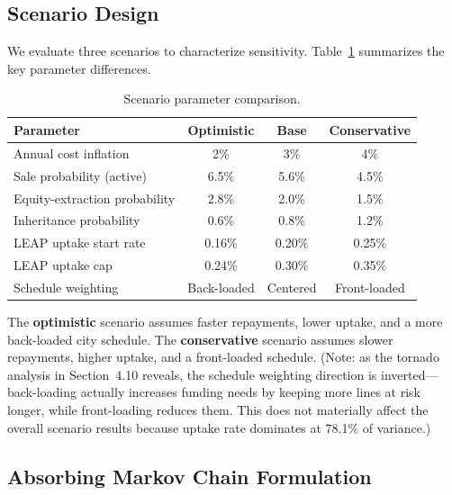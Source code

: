 \documentclass[11pt, letterpaper]{article}
\begin{document}
\subsection{Scenario Design}

We evaluate three scenarios to characterize sensitivity. Table~\ref{tab:scenarios} summarizes the key parameter differences.

\begin{table}[H]
  \centering
  \caption{Scenario parameter comparison.}
  \label{tab:scenarios}
  \begin{tabular}{@{}lccc@{}}
    \toprule
    \textbf{Parameter} & \textbf{Optimistic} & \textbf{Base} & \textbf{Conservative} \\
    \midrule
    Annual cost inflation & 2\% & 3\% & 4\% \\
    Sale probability (active) & 6.5\% & 5.6\% & 4.5\% \\
    Equity-extraction probability & 2.8\% & 2.0\% & 1.5\% \\
    Inheritance probability & 0.6\% & 0.8\% & 1.2\% \\
    LEAP uptake start rate & 0.16\% & 0.20\% & 0.25\% \\
    LEAP uptake cap & 0.24\% & 0.30\% & 0.35\% \\
    Schedule weighting & Back-loaded & Centered & Front-loaded \\
    \bottomrule
  \end{tabular}
\end{table}

The \textbf{optimistic} scenario assumes faster repayments, lower uptake, and a more back-loaded city schedule. The \textbf{conservative} scenario assumes slower repayments, higher uptake, and a front-loaded schedule. (Note: as the tornado analysis in Section~4.10 reveals, the schedule weighting direction is inverted---back-loading actually increases funding needs by keeping more lines at risk longer, while front-loading reduces them. This does not materially affect the overall scenario results because uptake rate dominates at 78.1\% of variance.)

\subsection{Absorbing Markov Chain Formulation}
\end{document}
